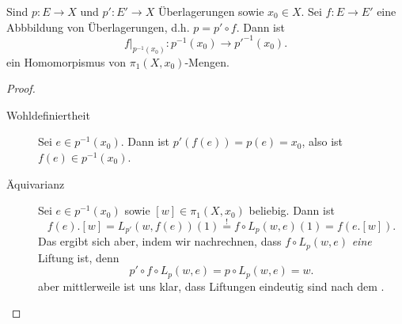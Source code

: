 \begin{lemma}
    Sind $p\colon  E\to X$ und $p'\colon E'\to X$ Überlagerungen sowie $x_0\in X$. Sei $f\colon  E\to  E'$ eine Abbbildung von Überlagerungen, d.h. $p = p' \circ f$. Dann ist
    \[
        f|_{p^{-1} (x_0)}\colon  p^{-1} (x_0) \to  p'^{-1}(x_0)
    .\] 
    ein Homomorpismus von $\pi_1(X,x_0)$-Mengen.
\end{lemma}
\begin{proof}
    \begin{description}
        \item[Wohldefiniertheit] Sei $e\in p^{-1} (x_0)$. Dann ist $p'(f(e)) = p(e) = x_0$, also ist $f(e) \in p^{-1} (x_0)$.
        \item[Äquivarianz] Sei $e\in p^{-1} (x_0)$ sowie $[w]\in \pi_1(X,x_0)$ beliebig. Dann ist
            \[
                f(e).[w] = L_{p'}(w,f(e))(1) \stackrel{!}{=} f \circ L_p(w,e)(1) = f(e.[w])
            .\] 
            Das ergibt sich aber, indem wir nachrechnen, dass $f \circ  L_p(w,e)$ \textit{eine} Liftung ist, denn
            \[
                p' \circ  f \circ  L_p(w,e) = p \circ  L_p(w,e) = w
            .\]
            aber mittlerweile ist uns klar, dass Liftungen eindeutig sind nach dem .
    \end{description}
\end{proof}

